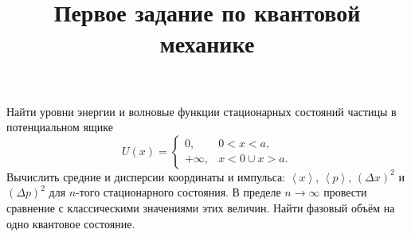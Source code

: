 \documentclass[a4paper]{article}
\title{Первое задание по квантовой механике}
\begin{document}
	\maketitle
\begin{problem}
	Найти уровни энергии и волновые функции стационарных
состояний частицы в потенциальном ящике
\[
	U(x)= \begin{cases}
		0, & 0<x<a,\\
		+\infty, & x<0 \cup x>a.
	\end{cases}
\] 
Вычислить средние и дисперсии координаты и импульса:
$\left<x \right>,\,\left<p \right>,\, (\Delta x)^2$ и $(\Delta p)^2$ для  $n$-того стационарного состояния. В пределе $n\to  \infty$ 
провести сравнение с классическими значениями этих величин.
Найти фазовый объём на одно квантовое состояние.

\end{problem}
\end{document}
